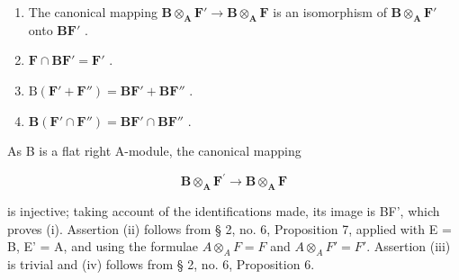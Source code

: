 \begin{enumerate}
\def\labelenumi{(\roman{enumi})}
\item
  The canonical mapping \(\mathbf{B} \otimes_{\mathbf{A}} \mathbf{F}' \to \mathbf{B} \otimes_{\mathbf{A}} \mathbf{F}\) is an isomorphism of \(\mathbf{B} \otimes_{\mathbf{A}} \mathbf{F}'\) onto \(\mathbf{BF}'\) .
\item
  \(\mathbf{F} \cap \mathbf{BF}' = \mathbf{F}'\) .
\item
  \(\mathrm{B}(\mathbf{F}' + \mathbf{F}'') = \mathbf{BF}' + \mathbf{BF}''\) .
\item
  \(\mathbf{B}(\mathbf{F}'\cap \mathbf{F}'')=\mathbf{B}\mathbf{F}'\cap \mathbf{B}\mathbf{F}''\) .
\end{enumerate}

As B is a flat right A-module, the canonical mapping

\[
\mathbf {B} \otimes_ {\mathbf {A}} \mathbf {F} ^ {\prime} \rightarrow \mathbf {B} \otimes_ {\mathbf {A}} \mathbf {F}
\]

is injective; taking account of the identifications made, its image is BF', which proves (i). Assertion (ii) follows from § 2, no. 6, Proposition 7, applied with E = B, E' = A, and using the formulae \(A \otimes_{A} F = F\) and \(A \otimes_{A} F' = F'\). Assertion (iii) is trivial and (iv) follows from § 2, no. 6, Proposition 6.

